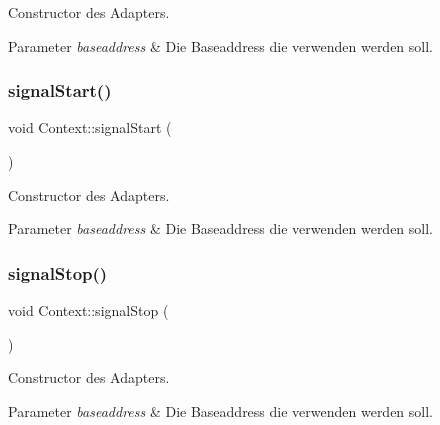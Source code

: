 Constructor des Adapters.


\begin{DoxyParams}{Parameter}
{\em baseaddress} & Die Baseaddress die verwenden werden soll. \\
\hline
\end{DoxyParams}
\hypertarget{class_context_a9fbe4299614bae2f11e92ed56cde640c}{}\label{class_context_a9fbe4299614bae2f11e92ed56cde640c} 
\subsubsection{\texorpdfstring{signal\+Start()}{signalStart()}\hspace{0.1cm}{\footnotesize\ttfamily [2/2]}}
{\footnotesize\ttfamily void Context\+::signal\+Start (\begin{DoxyParamCaption}{ }\end{DoxyParamCaption})}

Constructor des Adapters.


\begin{DoxyParams}{Parameter}
{\em baseaddress} & Die Baseaddress die verwenden werden soll. \\
\hline
\end{DoxyParams}
\hypertarget{class_context_ac729f3e2184382006588a438622f235f}{}\label{class_context_ac729f3e2184382006588a438622f235f} 
\subsubsection{\texorpdfstring{signal\+Stop()}{signalStop()}\hspace{0.1cm}{\footnotesize\ttfamily [1/2]}}
{\footnotesize\ttfamily void Context\+::signal\+Stop (\begin{DoxyParamCaption}{ }\end{DoxyParamCaption})}

Constructor des Adapters.


\begin{DoxyParams}{Parameter}
{\em baseaddress} & Die Baseaddress die verwenden werden soll. \\
\hline
\end{DoxyParams}
\hypertarget{class_context_ac729f3e2184382006588a438622f235f}{}\label{class_context_ac729f3e2184382006588a438622f235f} 
